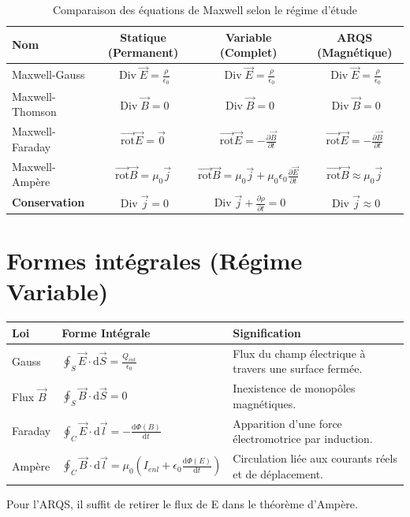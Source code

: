 \documentclass[french]{yLectureNote}
\renewcommand{\vec}{\overrightarrow}
\newcommand{\dd}{\mathrm{d}}
\DeclareMathOperator{\Div}{Div}
\newcommand{\rot}{\vec{\mathrm{rot}}}
\begin{document}
\begin{table}[h!]
    \centering
     \small
    \renewcommand{\arraystretch}{2} %
    \begin{tabular}{|l|c|c|c|}
        \hline
        \textbf{Nom} & \textbf{Statique} (Permanent) & \textbf{Variable} (Complet) & \textbf{ARQS} (Magnétique) \\ \hline
        Maxwell-Gauss & $\Div \vec{E} = \frac{\rho}{\epsilon_0}$ & $\Div \vec{E} = \frac{\rho}{\epsilon_0}$ & $\Div \vec{E} = \frac{\rho}{\epsilon_0}$ \\ \hline
        Maxwell-Thomson & $\Div \vec{B} = 0$ & $\Div \vec{B} = 0$ & $\Div \vec{B} = 0$ \\ \hline
        Maxwell-Faraday & $\rot \vec{E} = \vec{0}$ & $\rot \vec{E} = -\frac{\partial \vec{B}}{\partial t}$ & $\rot \vec{E} = -\frac{\partial \vec{B}}{\partial t}$ \\ \hline
        Maxwell-Ampère & $\rot \vec{B} = \mu_0 \vec{j}$ & $\rot \vec{B} = \mu_0 \vec{j} + \mu_0 \epsilon_0 \frac{\partial \vec{E}}{\partial t}$ & $\rot \vec{B} \approx \mu_0 \vec{j}$ \\ \hline
        \textbf{Conservation} & $\Div \vec{j} = 0$ & $\Div \vec{j} + \frac{\partial \rho}{\partial t} = 0$ & $\Div \vec{j} \approx 0$ \\ \hline
    \end{tabular}
    \caption{Comparaison des équations de Maxwell selon le régime d'étude}
   
\end{table}

\section{Formes intégrales (Régime Variable)}

\begin{table}[h!]
    \centering
    \small
    \renewcommand{\arraystretch}{2.2}
    \begin{tabular}{|l|l|l|}
        \hline
        \textbf{Loi} & \textbf{Forme Intégrale} & \textbf{Signification} \\ \hline
        Gauss & $\oint_S \vec{E} \cdot \dd \vec{S} = \frac{Q_{int}}{\epsilon_0}$ & Flux du champ électrique à travers une surface fermée. \\ \hline
        Flux $\vec{B}$ & $\oint_S \vec{B} \cdot \dd \vec{S} = 0$ & Inexistence de monopôles magnétiques. \\ \hline
        Faraday & $\oint_C \vec{E} \cdot \dd \vec{l} = -\frac{\dd \Phi(B)}{\dd t}$ & Apparition d'une force électromotrice par induction. \\ \hline
        Ampère & $\oint_C \vec{B} \cdot \dd \vec{l} = \mu_0 (I_{enl} + \epsilon_0 \frac{\dd \Phi(E)}{\dd t})$ & Circulation liée aux courants réels et de déplacement. \\ \hline
    \end{tabular}
\end{table}
Pour l'ARQS, il suffit de retirer le flux de E dans le théorème d'Ampère.


\end{document}
